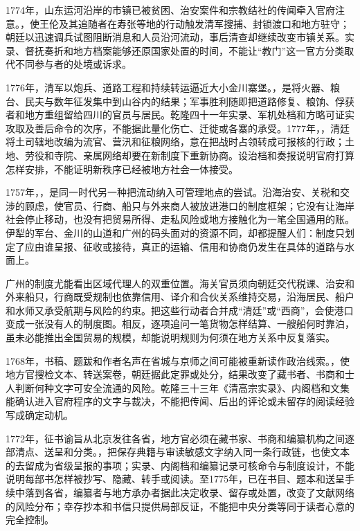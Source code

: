 1774年，山东运河沿岸的市镇已被贫困、治安案件和宗教结社的传闻牵入官府注意。，使王伦及其追随者在寿张等地的行动触发清军搜捕、封锁渡口和地方驻守；朝廷以迅速调兵试图阻断消息和人员沿河流动，事后清查却继续改变市镇关系。实录、督抚奏折和地方档案能够还原国家处置的时间，不能让“教门”这一官方分类取代不同参与者的处境或诉求。

1776年，清军以炮兵、道路工程和持续转运逼近大小金川寨堡。，是将火器、粮台、民夫与数年征发集中到山谷内的结果；军事胜利随即把道路修复、粮饷、俘获者和地方重组留给四川的官员与居民。乾隆四十一年实录、军机处档和方略可证实攻取及善后命令的次序，不能据此量化伤亡、迁徙或各寨的承受。1777年，，清廷将土司辖地改编为流官、营汛和征粮网络，意在把战时占领转成可报核的行政；土地、劳役和寺院、亲属网络却要在新制度下重新协商。设治档和奏报说明官府打算怎样安排，不能证明新秩序已经被地方社会一体接受。

1757年，，是同一时代另一种把流动纳入可管理地点的尝试。沿海治安、关税和交涉的顾虑，使官员、行商、船只与外来商人被放进港口的制度框架；它没有让海岸社会停止移动，也没有把贸易所得、走私风险或地方接触化为一笔全国通用的账。伊犁的军台、金川的山道和广州的码头面对的资源不同，却都提醒人们：制度只划定了应由谁呈报、征收或接待，真正的运输、信用和协商仍发生在具体的道路与水面上。

广州的制度尤能看出区域代理人的双重位置。海关官员须向朝廷交代税课、治安和外来船只，行商既受规制也依靠信用、译介和合伙关系维持交易，沿海居民、船户和水师又承受航期与风险的约束。把这些行动者合并成“清廷”或“西商”，会使港口变成一张没有人的制度图。相反，逐项追问一笔货物怎样结算、一艘船何时靠泊，虽未必能推出全国贸易的规模，却能说明规则为何须在地方关系中反复落实。

1768年，书稿、题跋和作者名声在省城与京师之间可能被重新读作政治线索。，使地方官搜检文本、转送案卷，朝廷据此定罪或处分，结果改变了藏书者、书商和士人判断何种文字可安全流通的风险。乾隆三十三年《清高宗实录》、内阁档和文集能确认进入官府程序的文字与裁决，不能把传闻、后出的评论或未留存的阅读经验写成确定动机。

1772年，征书谕旨从北京发往各省，地方官必须在藏书家、书商和编纂机构之间逐部清点、送呈和分类。，把保存典籍与审读敏感文字纳入同一条行政链，也使文本的去留成为省级呈报的事项；实录、内阁档和编纂记录可核命令与制度设计，不能说明每部书怎样被抄写、隐藏、转手或阅读。至1775年，已在书目、题本和送呈手续中落到各省，编纂者与地方承办者据此决定收录、留存或处置，改变了文献网络的风险分布；幸存抄本和书信只提供局部反证，不能把中央分类等同于读者心意的完全控制。

